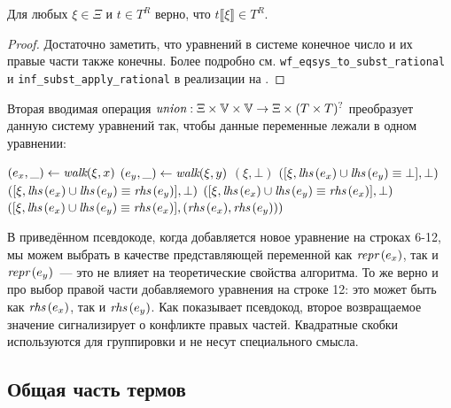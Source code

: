 \begin{theorem}
    Для любых $\xi \in \Xi$ и $t \in T^R$ верно, что $t \llbracket \xi \rrbracket \in T^R$.
\end{theorem}
\begin{proof}
    Достаточно заметить, что уравнений в системе конечное число и их правые части также конечны. Более подробно см. \texttt{wf\_eqsys\_to\_subst\_rational} и \texttt{inf\_subst\_apply\_rational} в реализации на \Rocq.
\end{proof}

Вторая вводимая операция $\textit{union} : \Xi \times \mathbb{V} \times \mathbb{V} \rightarrow \Xi \times (T \times T)^?$ преобразует данную систему уравнений так, чтобы данные переменные лежали в одном уравнении:
\begin{algorithmic}[1]
        \State $(e_x, \_) \gets \textit{walk} (\xi, x)$
        \State $(e_y, \_) \gets \textit{walk} (\xi, y)$
            \State \Return $(\xi, \bot)$
        \EndIf
            \State \Return $([\xi, \textit{lhs}\,(e_x) \cup \textit{lhs}\,(e_y) \equiv \bot], \bot)$
        \EndIf
            \State \Return $([\xi, \textit{lhs}\,(e_x) \cup \textit{lhs}\,(e_y) \equiv \textit{rhs}\,(e_y)], \bot)$
        \EndIf
            \State \Return $([\xi, \textit{lhs}\,(e_x) \cup \textit{lhs}\,(e_y) \equiv \textit{rhs}\,(e_x)], \bot)$
        \EndIf
        \State \Return $([\xi, \textit{lhs}\,(e_x) \cup \textit{lhs}\,(e_y) \equiv \textit{rhs}\,(e_x)],(\textit{rhs}\,(e_x), \textit{rhs}\,(e_y)))$ \\
    \EndFunction
\end{algorithmic}

В приведённом псевдокоде, когда добавляется новое уравнение на строках 6-12, мы можем выбрать в качестве представляющей переменной как $\textit{repr}\,(e_x)$, так и $\textit{repr}\,(e_y)$~--- это не влияет на теоретические свойства алгоритма. То же верно и про выбор правой части добавляемого уравнения на строке 12: это может быть как $\textit{rhs}\,(e_x)$, так и $\textit{rhs}\,(e_y)$. Как показывает псевдокод, второе возвращаемое значение сигнализирует о конфликте правых частей. Квадратные скобки используются для группировки и не несут специального смысла.


\subsection{Общая часть термов}


